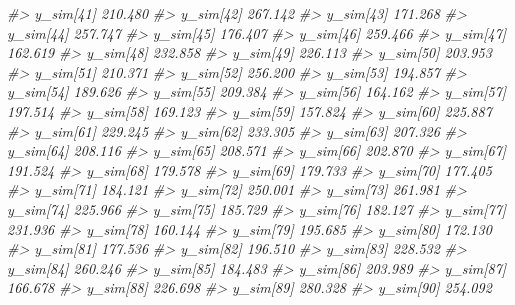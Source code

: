 \documentclass[
  10pt,
  italian,
  a4paper,
  extrafontsizes,onecolumn,openright
  ]{memoir}
\newenvironment{Shaded}{\begin{snugshade}}{\end{snugshade}}
\newcommand{\CommentTok}[1]{\textcolor[rgb]{0.56,0.35,0.01}{\textit{#1}}}
\begin{document}
\begin{Shaded}
\begin{Highlighting}[]
\CommentTok{\#\textgreater{}   y\_sim[41]  210.480}
\CommentTok{\#\textgreater{}   y\_sim[42]  267.142}
\CommentTok{\#\textgreater{}   y\_sim[43]  171.268}
\CommentTok{\#\textgreater{}   y\_sim[44]  257.747}
\CommentTok{\#\textgreater{}   y\_sim[45]  176.407}
\CommentTok{\#\textgreater{}   y\_sim[46]  259.466}
\CommentTok{\#\textgreater{}   y\_sim[47]  162.619}
\CommentTok{\#\textgreater{}   y\_sim[48]  232.858}
\CommentTok{\#\textgreater{}   y\_sim[49]  226.113}
\CommentTok{\#\textgreater{}   y\_sim[50]  203.953}
\CommentTok{\#\textgreater{}   y\_sim[51]  210.371}
\CommentTok{\#\textgreater{}   y\_sim[52]  256.200}
\CommentTok{\#\textgreater{}   y\_sim[53]  194.857}
\CommentTok{\#\textgreater{}   y\_sim[54]  189.626}
\CommentTok{\#\textgreater{}   y\_sim[55]  209.384}
\CommentTok{\#\textgreater{}   y\_sim[56]  164.162}
\CommentTok{\#\textgreater{}   y\_sim[57]  197.514}
\CommentTok{\#\textgreater{}   y\_sim[58]  169.123}
\CommentTok{\#\textgreater{}   y\_sim[59]  157.824}
\CommentTok{\#\textgreater{}   y\_sim[60]  225.887}
\CommentTok{\#\textgreater{}   y\_sim[61]  229.245}
\CommentTok{\#\textgreater{}   y\_sim[62]  233.305}
\CommentTok{\#\textgreater{}   y\_sim[63]  207.326}
\CommentTok{\#\textgreater{}   y\_sim[64]  208.116}
\CommentTok{\#\textgreater{}   y\_sim[65]  208.571}
\CommentTok{\#\textgreater{}   y\_sim[66]  202.870}
\CommentTok{\#\textgreater{}   y\_sim[67]  191.524}
\CommentTok{\#\textgreater{}   y\_sim[68]  179.578}
\CommentTok{\#\textgreater{}   y\_sim[69]  179.733}
\CommentTok{\#\textgreater{}   y\_sim[70]  177.405}
\CommentTok{\#\textgreater{}   y\_sim[71]  184.121}
\CommentTok{\#\textgreater{}   y\_sim[72]  250.001}
\CommentTok{\#\textgreater{}   y\_sim[73]  261.981}
\CommentTok{\#\textgreater{}   y\_sim[74]  225.966}
\CommentTok{\#\textgreater{}   y\_sim[75]  185.729}
\CommentTok{\#\textgreater{}   y\_sim[76]  182.127}
\CommentTok{\#\textgreater{}   y\_sim[77]  231.936}
\CommentTok{\#\textgreater{}   y\_sim[78]  160.144}
\CommentTok{\#\textgreater{}   y\_sim[79]  195.685}
\CommentTok{\#\textgreater{}   y\_sim[80]  172.130}
\CommentTok{\#\textgreater{}   y\_sim[81]  177.536}
\CommentTok{\#\textgreater{}   y\_sim[82]  196.510}
\CommentTok{\#\textgreater{}   y\_sim[83]  228.532}
\CommentTok{\#\textgreater{}   y\_sim[84]  260.246}
\CommentTok{\#\textgreater{}   y\_sim[85]  184.483}
\CommentTok{\#\textgreater{}   y\_sim[86]  203.989}
\CommentTok{\#\textgreater{}   y\_sim[87]  166.678}
\CommentTok{\#\textgreater{}   y\_sim[88]  226.698}
\CommentTok{\#\textgreater{}   y\_sim[89]  280.328}
\CommentTok{\#\textgreater{}   y\_sim[90]  254.092}

\end{Highlighting}
\end{Shaded}
\end{document}
